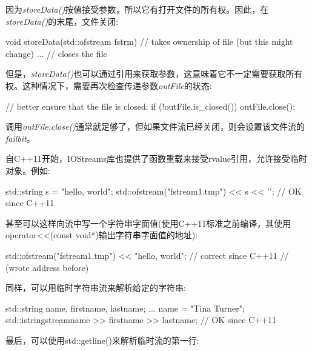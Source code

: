 因为\textit{storeData()}按值接受参数，所以它有打开文件的所有权。因此，在\textit{storeData()}的末尾，文件关闭:\par

\begin{codebox}[cpp]
void storeData(std::ofstream fstrm) // takes ownership of file (but this might change)
{
  ...
} // closes the file
\end{codebox}

但是，\textit{storeData()}也可以通过引用来获取参数，这意味着它不一定需要获取所有权。这种情况下，需要再次检查传递参数\textit{outFile}的状态:\par

\begin{codebox}[cpp]
// better ensure that the file is closed:
if (!outFile.is_closed()) {
  outFile.close();
}
\end{codebox}

调用\textit{outFile.close(\allowbreak{})\allowbreak{}}通常就足够了，但如果文件流已经关闭，则会设置该文件流的\textit{failbit}。\par


自C++11开始，IOStreams库也提供了函数重载来接受rvalue引用，允许接受临时对象。例如:\par

\begin{codebox}[cpp]
std::string s = "hello, world";
std::ofstream("fstream1.tmp") << s << '\n'; // OK since C++11
\end{codebox}

甚至可以这样向流中写一个字符串字面值(使用C++11标准之前编译，其使用operator<<(const void*)输出字符串字面值的地址):\par

\begin{codebox}[cpp]
std::ofstream("fstream1.tmp") << "hello, world\n"; // correct since C++11
// (wrote address before)
\end{codebox}

同样，可以用临时字符串流来解析给定的字符串:\par

\begin{codebox}[cpp]
std::string name, firstname, lastname;
...
name = "Tina Turner";
std::istringstream{name} >> firstname >> lastname; // OK since C++11
\end{codebox}

最后，可以使用std::getline()来解析临时流的第一行:\par

